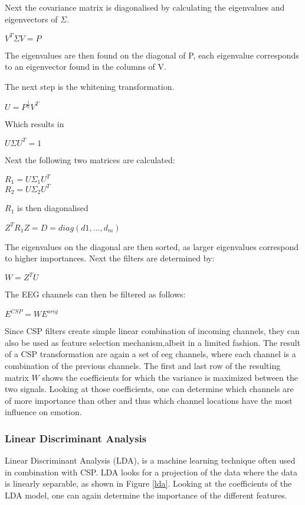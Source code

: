 \npar

Next the covariance matrix is diagonalised by calculating the eigenvalues and eigenvectors of $\Sigma$.
\begin{center}
$V^T\Sigma V = P$
\end{center}
The eigenvalues are then found on the diagonal of P, each eigenvalue corresponds to an eigenvector found in the columns of V.

\npar

The next step is the whitening transformation.
\begin{center}
$U = P^{\frac{1}{2}}V^T$ \\
\end{center}
Which results in
\begin{center}
$U\Sigma U^T = 1$
\end{center}
Next the following two matrices are calculated:
\begin{center}
$R_1 = U\Sigma_1U^T$\\
$R_2 = U\Sigma_2U^T$
\end{center}
$R_1$ is then diagonalised
\begin{center}
$Z^TR_1Z = D = diag(d1, ..., d_m)$
\end{center}
The eigenvalues on the diagonal are then sorted, as larger eigenvalues correspond to higher importances. %
Next the filters are determined by:
\begin{center}
$W = Z^TU$
\end{center}
The EEG channels can then be filtered as follows:
\begin{center}
$E^{CSP} = WE^{orig}$
\end{center}

\npar

Since CSP filters create simple linear combination of incoming channels, they can also be used as feature selection mechanism,albeit in a limited fashion. The result of a CSP transformation are again a set of eeg channels, where each channel is a combination of the previous channels. The first and last row of the resulting matrix $W$ shows the coefficients for which the variance is maximized between the two signals. Looking at those coefficients, one can determine which channels are of more importance than other and thus which channel locations have the most influence on emotion.

\subsubsection{Linear Discriminant Analysis}
Linear Discriminant Analysis (LDA), is a machine learning technique often used in combination with CSP\cite{ErrorPotentials,svmldacomp,currTrends}. LDA looks for a projection of the data where the data is linearly separable, as shown in Figure \ref{lda}. Looking at the coefficients of the LDA model, one can again determine the importance of the different features.

